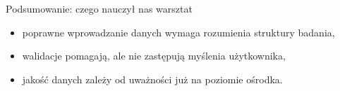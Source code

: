 

\begin{frame}{Podsumowanie: czego nauczył nas warsztat}
  \begin{itemize}
    \item poprawne wprowadzanie danych wymaga rozumienia struktury badania,
    \item walidacje pomagają, ale nie zastępują myślenia użytkownika,
    \item jakość danych zależy od uważności już na poziomie ośrodka.
  \end{itemize}
\end{frame}
